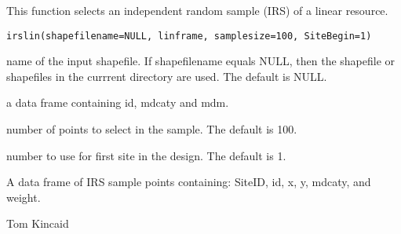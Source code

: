 \begin{Description}\relax
This function selects an independent random sample (IRS) of a linear resource.
\end{Description}
\begin{Usage}
\begin{verbatim}
irslin(shapefilename=NULL, linframe, samplesize=100, SiteBegin=1)
\end{verbatim}
\end{Usage}
\begin{Arguments}
\begin{ldescription}
\item[\code{shapefilename}] name of the input shapefile.  If shapefilename equals
NULL, then the shapefile or shapefiles in the currrent directory are used.
The default is NULL.
\item[\code{linframe}] a data frame containing id, mdcaty and mdm.
\item[\code{samplesize}] number of points to select in the sample.  The default is
100.
\item[\code{SiteBegin}] number to use for first site in the design.  The default is
1.
\end{ldescription}
\end{Arguments}
\begin{Value}
A data frame of IRS sample points containing: SiteID, id, x, y, mdcaty,
and weight.
\end{Value}
\begin{Author}\relax
Tom Kincaid 
\end{Author}
\begin{SeeAlso}\relax
{}
\end{SeeAlso}

